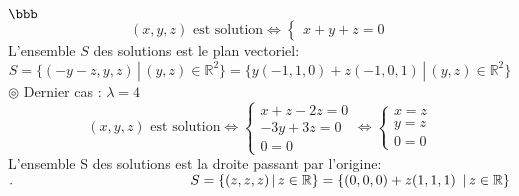 \documentclass[11pt]{article}
\begin{document}
\begin{exercice}{$\bbb$}{}
    \begin{equation*}
        (x,y,z) \text{ est solution}
        \iff\begin{cases}
            x+y+z=0
        \end{cases}
    \end{equation*}
    L'ensemble $S$ des solutions est le plan vectoriel: 
    \begin{equation*}
        S=\{(-y-z,y,z)\,|\, (y,z)\in\mathbb{R}^2\}=\{y(-1,1,0) + z(-1,0,1)\,|\,(y,z)\in\mathbb{R}^2\}
    \end{equation*}
    $\circledcirc$ Dernier cas : $\lambda=4$
    \begin{equation*}
        (x,y,z) \text{ est solution} \iff \begin{cases}
            x+z-2z=0\\
            -3y+3z=0\\
            0=0
        \end{cases}
        \iff\begin{cases}
            x=z\\
            y=z\\
            0=0
        \end{cases}
    \end{equation*}
    L'ensemble S des solutions est la droite passant par l'origine:\\
    $. \hspace{4.5cm} S = \{(z,z,z)\,|\,z\in\mathbb{R}\} = \{(0,0,0) + z(1,1,1)\ \,|\, z\in\mathbb{R}\}$\\
\end{exercice}
\end{document}
